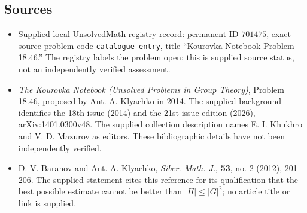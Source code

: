 \documentclass[11pt]{article}
\begin{document}
\subsection{Sources}
\begin{itemize}
\item Supplied local UnsolvedMath registry record: permanent ID \(701475\), exact source problem code \texttt{catalogue entry}, title ``Kourovka Notebook Problem 18.46.'' The registry labels the problem open; this is supplied source status, not an independently verified assessment.
\item \emph{The Kourovka Notebook (Unsolved Problems in Group Theory)}, Problem 18.46, proposed by Ant. A. Klyachko in 2014. The supplied background identifies the 18th issue (2014) and the 21st issue edition (2026), arXiv:1401.0300v48. The supplied collection description names E. I. Khukhro and V. D. Mazurov as editors. These bibliographic details have not been independently verified.
\item D. V. Baranov and Ant. A. Klyachko, \emph{Siber. Math. J.}, \textbf{53}, no. 2 (2012), 201--206. The supplied statement cites this reference for its qualification that the best possible estimate cannot be better than \(|H|\le |G|^2\); no article title or link is supplied.
\end{itemize}
\end{document}
